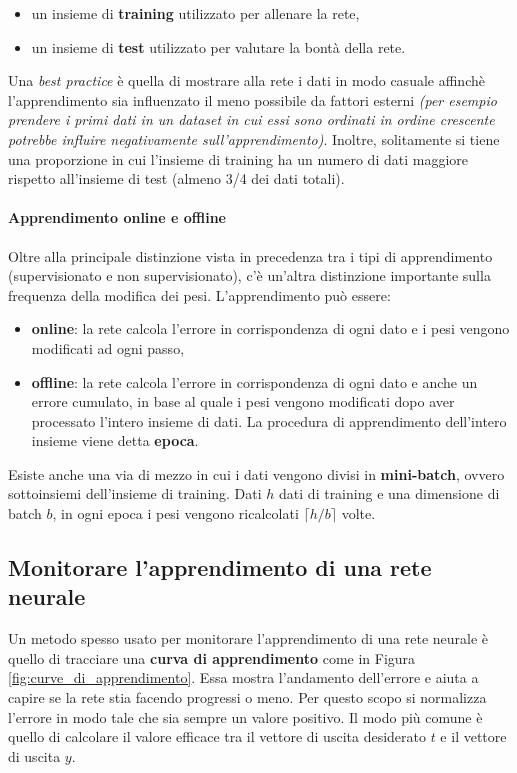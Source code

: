 \documentclass[12pt, twoside, letterpaper]{report}
\begin{document}
			\begin{itemize}
				\item un insieme di \textbf{training} utilizzato per allenare la rete,
				\item un insieme di \textbf{test} utilizzato per valutare la bontà della rete.
			\end{itemize}
			Una \textit{best practice} è quella di mostrare alla rete i dati in modo casuale affinchè l'apprendimento sia influenzato il meno possibile da fattori esterni \textit{(per esempio prendere i primi dati in un dataset in cui essi sono ordinati in ordine crescente potrebbe influire negativamente sull'apprendimento)}. Inoltre, solitamente si tiene una proporzione in cui l'insieme di training ha un numero di dati maggiore rispetto all'insieme di test (almeno 3/4 dei dati totali). 

			\paragraph{Apprendimento online e offline} Oltre alla principale distinzione vista in precedenza tra i tipi di apprendimento (supervisionato e non supervisionato), c'è un'altra distinzione importante sulla frequenza della modifica dei pesi. L'apprendimento può essere:
				\begin{itemize}
					\item \textbf{online}: la rete calcola l'errore in corrispondenza di ogni dato e i pesi vengono modificati ad ogni passo,
					\item \textbf{offline}: la rete calcola l'errore in corrispondenza di ogni dato e anche un errore cumulato, in base al quale i pesi vengono modificati dopo aver processato l'intero insieme di dati. La procedura di apprendimento dell'intero insieme viene detta \textbf{epoca}.
				\end{itemize}
				Esiste anche una via di mezzo in cui i dati vengono divisi in \textbf{mini-batch}, ovvero sottoinsiemi dell'insieme di training. Dati $h$ dati di training e una dimensione di batch $b$, in ogni epoca i pesi vengono ricalcolati $\lceil h/b \rceil$ volte.
			
			\subsection{Monitorare l'apprendimento di una rete neurale} \label{sec:monitor_appr}
				Un metodo spesso usato per monitorare l'apprendimento di una rete neurale è quello di tracciare una \textbf{curva di apprendimento} come in Figura \ref{fig:curve_di_apprendimento}. Essa mostra l'andamento dell'errore e aiuta a capire se la rete stia facendo progressi o meno. Per questo scopo si normalizza l'errore in modo tale che sia sempre un valore positivo. Il modo più comune è quello di calcolare il valore efficace tra il vettore di uscita desiderato $t$ e il vettore di uscita $y$. 
\end{document}
